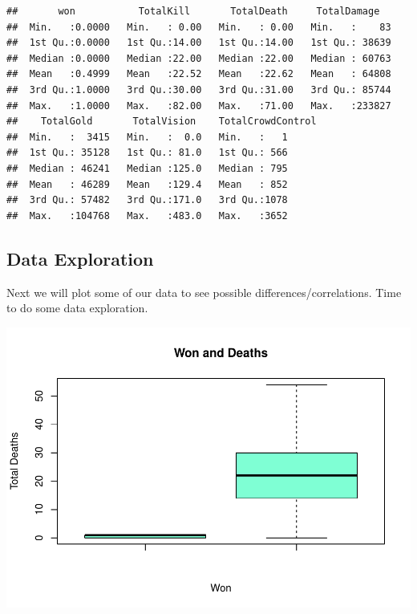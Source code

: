 \documentclass[
]{article}
\newenvironment{Shaded}{\begin{snugshade}}{\end{snugshade}}
\newcommand{\AttributeTok}[1]{\textcolor[rgb]{0.77,0.63,0.00}{#1}}
\newcommand{\ConstantTok}[1]{\textcolor[rgb]{0.00,0.00,0.00}{#1}}
\newcommand{\FunctionTok}[1]{\textcolor[rgb]{0.00,0.00,0.00}{#1}}
\newcommand{\NormalTok}[1]{#1}
\newcommand{\SpecialCharTok}[1]{\textcolor[rgb]{0.00,0.00,0.00}{#1}}
\newcommand{\StringTok}[1]{\textcolor[rgb]{0.31,0.60,0.02}{#1}}
\begin{document}
\begin{verbatim}
##       won           TotalKill       TotalDeath     TotalDamage    
##  Min.   :0.0000   Min.   : 0.00   Min.   : 0.00   Min.   :    83  
##  1st Qu.:0.0000   1st Qu.:14.00   1st Qu.:14.00   1st Qu.: 38639  
##  Median :0.0000   Median :22.00   Median :22.00   Median : 60763  
##  Mean   :0.4999   Mean   :22.52   Mean   :22.62   Mean   : 64808  
##  3rd Qu.:1.0000   3rd Qu.:30.00   3rd Qu.:31.00   3rd Qu.: 85744  
##  Max.   :1.0000   Max.   :82.00   Max.   :71.00   Max.   :233827  
##    TotalGold       TotalVision    TotalCrowdControl
##  Min.   :  3415   Min.   :  0.0   Min.   :   1     
##  1st Qu.: 35128   1st Qu.: 81.0   1st Qu.: 566     
##  Median : 46241   Median :125.0   Median : 795     
##  Mean   : 46289   Mean   :129.4   Mean   : 852     
##  3rd Qu.: 57482   3rd Qu.:171.0   3rd Qu.:1078     
##  Max.   :104768   Max.   :483.0   Max.   :3652
\end{verbatim}

\hypertarget{data-exploration}{%
\subsection{Data Exploration}\label{data-exploration}}

Next we will plot some of our data to see possible
differences/correlations. Time to do some data exploration.

\begin{Shaded}
\end{Shaded}

\includegraphics{Regression_files/figure-latex/unnamed-chunk-5-1.pdf}
\end{document}
